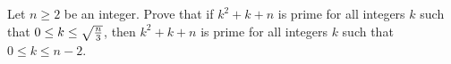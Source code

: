 Let $n\ge2$ be an integer. Prove that if $k^2+k+n$ is prime for all integers $k$ such that $0\le k\le\sqrt{n\over3}$,  then $k^2+k+n$ is prime for all integers $k$ such that $0\le k\le n-2$.